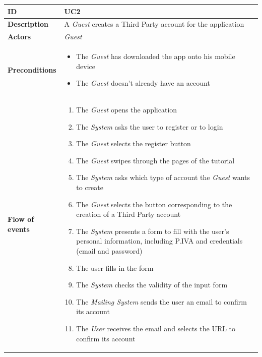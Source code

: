 \documentclass[titlepage]{article}
\begin{document}
			\begin{longtable}{| p{3 cm} | p{10 cm} |} 
			\hline
			{\bf ID} & UC2 \\
			\hline
			{\bf Description} & A {\it Guest} creates a Third Party account for the application \\
			\hline
			{\bf Actors} & {\it Guest} \\
			\hline
			{\bf Preconditions} & 		
							\begin{itemize}
								\item The {\it Guest}  has downloaded the app onto his mobile device
								\item The {\it Guest}  doesn’t already have an account
							\end{itemize}
			\\
			\hline
			{\bf Flow of events} & 
							\begin{enumerate}
								\item The {\it Guest} opens the application
								\item The {\it System} asks the user to register or to login
								\item The {\it Guest} selects the register button
								\item The {\it Guest} swipes through the pages of the tutorial
								\item The {\it System}  asks which type of account the {\it Guest} wants to create
								\item The {\it Guest} selects the button corresponding to the creation of a Third Party account
								\item The {\it System}  presents a form to fill with the user’s personal information, including P.IVA and credentials (email and password) 
								\item The user fills in the form
								\item The {\it System}  checks the validity of the input form
								\item The {\it Mailing System} sends the user an email to confirm its account
								\item The {\it User} receives the email and selects the URL to confirm its account
							\end{enumerate}
			

\end{longtable}
\end{document}
